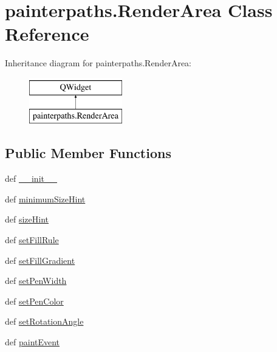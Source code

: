 \hypertarget{classpainterpaths_1_1RenderArea}{}\section{painterpaths.\+Render\+Area Class Reference}
\label{classpainterpaths_1_1RenderArea}
Inheritance diagram for painterpaths.\+Render\+Area\+:\begin{figure}[H]
\begin{center}
\leavevmode
\includegraphics[height=2.000000cm]{classpainterpaths_1_1RenderArea}
\end{center}
\end{figure}
\subsection*{Public Member Functions}
\begin{DoxyCompactItemize}
\item 
def \hyperlink{classpainterpaths_1_1RenderArea_a38b4c8d5dad408324222755546fc3b08}{\+\_\+\+\_\+init\+\_\+\+\_\+}
\item 
def \hyperlink{classpainterpaths_1_1RenderArea_a271bd573635bb5da8b60d1d4ed313b61}{minimum\+Size\+Hint}
\item 
def \hyperlink{classpainterpaths_1_1RenderArea_ac0a34baf20d5bc1734e7ecdf6697565c}{size\+Hint}
\item 
def \hyperlink{classpainterpaths_1_1RenderArea_a41e593efa88c7a1c139e926d544126fc}{set\+Fill\+Rule}
\item 
def \hyperlink{classpainterpaths_1_1RenderArea_add40c100ecb180707ce12a37be84739f}{set\+Fill\+Gradient}
\item 
def \hyperlink{classpainterpaths_1_1RenderArea_a5f5ad332f195fd6ab9e50289caab5a9b}{set\+Pen\+Width}
\item 
def \hyperlink{classpainterpaths_1_1RenderArea_af73a35da48ccad9423e613ee73c91ebe}{set\+Pen\+Color}
\item 
def \hyperlink{classpainterpaths_1_1RenderArea_aa94687ee1e08d52dc244ef42d901f01e}{set\+Rotation\+Angle}
\item 
def \hyperlink{classpainterpaths_1_1RenderArea_ae7eee3ee89a6c8a0897b7c0d89da23e7}{paint\+Event}
\end{DoxyCompactItemize}

